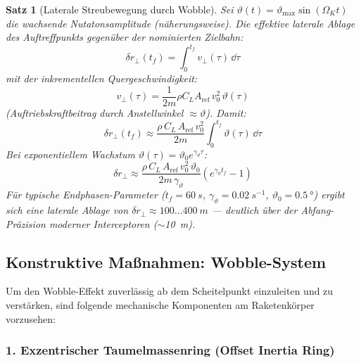 ﻿\documentclass[12pt,a4paper]{article}
\newtheorem{satz}{Satz}[section]
\begin{document}
\begin{satz}[Laterale Streubewegung durch Wobble]
Sei $\vartheta(t) = \vartheta_{\max}\sin(\Omega_K t)$ die wachsende Nutatonsamplitude
(näherungsweise).
Die effektive laterale Ablage des Auftreffpunkts gegenüber der nominierten Zielbahn:
\[
  \delta r_\perp(t_f) = \int_0^{t_f} v_\perp(\tau)\,\dd\tau
\]
mit der inkrementellen Quergeschwindigkeit:
\[
  v_\perp(\tau) = \frac{1}{2m}\rho C_L A_{\mathrm{ref}}\,v_0^2\,\vartheta(\tau)
\]
(Auftriebskraftbeitrag durch Anstellwinkel $\approx \vartheta$). Damit:
\[
  \boxed{\delta r_\perp(t_f) \approx \frac{\rho\,C_L\,A_{\mathrm{ref}}\,v_0^2}{2m}
    \int_0^{t_f} \vartheta(\tau)\,\dd\tau}
\]
Bei exponentiellem Wachstum $\vartheta(\tau) = \vartheta_0 e^{\gamma_\vartheta \tau}$:
\[
  \delta r_\perp \approx
    \frac{\rho\,C_L\,A_{\mathrm{ref}}\,v_0^2\,\vartheta_0}{2m\,\gamma_\vartheta}
    \left(e^{\gamma_\vartheta t_f} - 1\right)
\]
Für typische Endphasen-Parameter ($t_f = \SI{60}{s}$, $\gamma_\vartheta = \SI{0.02}{s^{-1}}$,
$\vartheta_0 = \SI{0.5}{\degree}$) ergibt sich eine laterale Ablage von
$\delta r_\perp \approx 100\ldots\SI{400}{m}$ --- deutlich über der Abfang-Präzision
moderner Interceptoren ($\sim$\SI{10}{m}).
\end{satz}

\subsection{Konstruktive Maßnahmen: Wobble-System}

Um den Wobble-Effekt zuverlässig ab dem Scheitelpunkt einzuleiten und zu verstärken,
sind folgende mechanische Komponenten am Raketenkörper vorzusehen:

\subsubsection{1. Exzentrischer Taumelmassenring (Offset Inertia Ring)}
\end{document}
